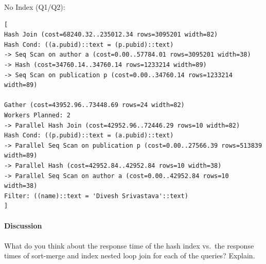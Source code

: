 \documentclass[11pt]{scrartcl}
\begin{document}
No Index (Q1/Q2):

{\small
\parskip0pt\begin{verbatim}
[
Hash Join (cost=68240.32..235012.34 rows=3095201 width=82)
Hash Cond: ((a.pubid)::text = (p.pubid)::text)
-> Seq Scan on author a (cost=0.00..57784.01 rows=3095201 width=38)
-> Hash (cost=34760.14..34760.14 rows=1233214 width=89)
-> Seq Scan on publication p (cost=0.00..34760.14 rows=1233214 width=89)

Gather (cost=43952.96..73448.69 rows=24 width=82)
Workers Planned: 2
-> Parallel Hash Join (cost=42952.96..72446.29 rows=10 width=82)
Hash Cond: ((p.pubid)::text = (a.pubid)::text)
-> Parallel Seq Scan on publication p (cost=0.00..27566.39 rows=513839 width=89)
-> Parallel Hash (cost=42952.84..42952.84 rows=10 width=38)
-> Parallel Seq Scan on author a (cost=0.00..42952.84 rows=10 width=38)
Filter: ((name)::text = 'Divesh Srivastava'::text)
]
\end{verbatim}}

\paragraph{Discussion}

What do you think about the response time of the hash index vs.\ the response times of sort-merge and index nested loop join for each of the queries? Explain.
\end{document}
